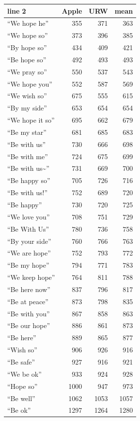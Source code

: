 \begin{tabular}{lrrr}\toprule
 line 2 & Apple & URW & mean \\ \midrule
``We hope he'' & 355 & 371 & 363 \\
``We hope so'' & 373 & 396 & 385 \\
``By hope so'' & 434 & 409 & 421 \\
``Be hope so'' & 492 & 493 & 493 \\
``We pray so'' & 550 & 537 & 543 \\
``We hope you'' & 552 & 587 & 569 \\
``We wish so'' & 675 & 555 & 615 \\
``By my side'' & 653 & 654 & 654 \\
``We hope it so'' & 695 & 662 & 679 \\
``Be my star'' & 681 & 685 & 683 \\
``Be with us'' & 730 & 666 & 698 \\
``Be with me'' & 724 & 675 & 699 \\
``Be with us\textasciitilde{}'' & 731 & 669 & 700 \\
``Be happy so'' & 705 & 726 & 716 \\
``Be with us!'' & 752 & 689 & 720 \\
``Be happy'' & 730 & 720 & 725 \\
``We love you'' & 708 & 751 & 729 \\
``Be With Us'' & 780 & 736 & 758 \\
``By your side'' & 760 & 766 & 763 \\
``We are hope'' & 752 & 793 & 772 \\
``Be my hope'' & 794 & 771 & 783 \\
``We keep hope'' & 764 & 811 & 788 \\
``Be here now'' & 837 & 796 & 817 \\
``Be at peace'' & 873 & 798 & 835 \\
``Be with you'' & 867 & 858 & 863 \\
``Be our hope'' & 886 & 861 & 873 \\
``Be here'' & 889 & 865 & 877 \\
``Wish so'' & 906 & 926 & 916 \\
``Be safe'' & 927 & 916 & 921 \\
``We be ok'' & 933 & 924 & 928 \\
``Hope so'' & 1000 & 947 & 973 \\
``Be well'' & 1062 & 1053 & 1057 \\
``Be ok'' & 1297 & 1264 & 1280 \\
\bottomrule\end{tabular}
